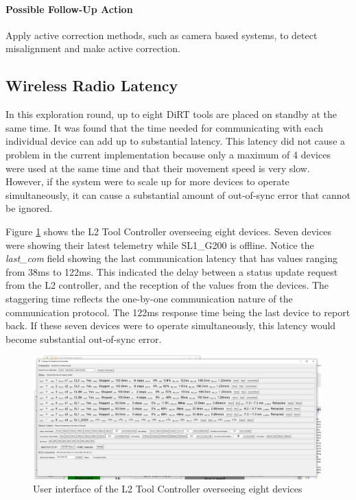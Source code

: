 \paragraph{Possible Follow-Up Action}

Apply active correction methods, such as camera based systems, to detect misalignment and make active correction.

\FloatBarrier

\subsection{Wireless Radio Latency}
\label{subsection:exploration-5-wireless-radio-latency}

In this exploration round, up to eight DiRT tools are placed on standby at the same time. It was found that the time needed for communicating with each individual device can add up to substantial latency. This latency did not cause a problem in the current implementation because only a maximum of 4 devices were used at the same time and that their movement speed is very slow. However, if the system were to scale up for more devices to operate simultaneously, it can cause a substantial amount of out-of-sync error that cannot be ignored.

Figure \ref{fig:tool-controller-overseeing-eight-devices} shows the L2 Tool Controller overseeing eight devices. Seven devices were showing their latest telemetry while SL1\_G200 is offline. Notice the \textit{last\_com }field showing the last communication latency that has values ranging from 38ms to 122ms. This indicated the delay between a status update request from the L2 controller, and the reception of the values from the devices. The staggering time reflects the one-by-one communication nature of the communication protocol. The 122ms response time being the last device to report back. If these seven devices were to operate simultaneously, this latency would become substantial out-of-sync error. 

\begin{figure}[!h]
    \centering
    \includegraphics[width=0.99\textwidth]{images/08/img39.jpg}
    \caption{User interface of the L2 Tool Controller overseeing eight devices}
    \label{fig:tool-controller-overseeing-eight-devices}
\end{figure}


